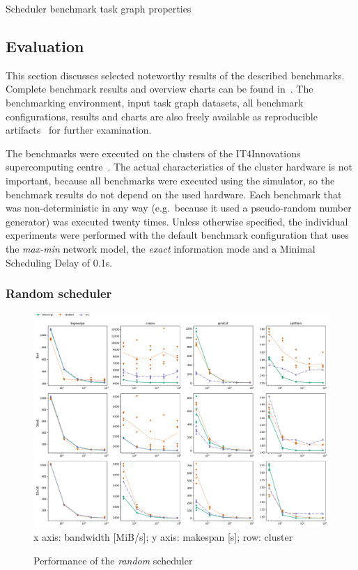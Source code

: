 \begin{table}
	\caption{Scheduler benchmark task graph properties}
	\label{tab:estee-graph-properties}
\end{table}

\subsection{Evaluation}
This section discusses selected noteworthy results of the described benchmarks. Complete
benchmark results and overview charts can be found in~\cite{estee}. The benchmarking
environment, input task graph datasets, all benchmark configurations, results and charts are
also freely available as reproducible artifacts~\cite{estee_results} for further examination.

The benchmarks were executed on the clusters of the IT4Innovations supercomputing
centre~\cite{it4i}. The actual characteristics of the cluster hardware is not
important, because all benchmarks were executed using the \estee{} simulator, so the
benchmark results do not depend on the used hardware. Each benchmark that was non-deterministic in
any way (e.g.\ because it used a pseudo-random number generator) was executed twenty times. Unless
otherwise specified, the individual experiments were performed with the default benchmark
configuration that uses the \emph{max-min} network model, the \emph{exact}
information mode and a Minimal Scheduling Delay of 0.1s.

\subsubsection*{Random scheduler}

\begin{figure}
	\centering
	\includegraphics[width=\textwidth]{imgs/estee/charts/random-scheduler}\\
	{\small x axis: bandwidth [MiB/s]; y axis: makespan [s]; row: cluster}
	\caption{Performance of the \emph{random} scheduler}
	\label{fig:estee-chart-random-scheduler}
\end{figure}

